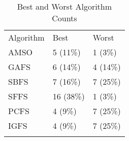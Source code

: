\begin{table}
\caption{Best and Worst Algorithm Counts}
\label{tbl:best:worst:count}
\begin{tabular}{lll}
\noalign{\smallskip}\hline\noalign{\smallskip}
Algorithm&Best&Worst\\
\noalign{\smallskip}\hline
AMSO&5 (11\%)&1 (3\%)\\
GAFS&6 (14\%)&4 (14\%)\\
SBFS&7 (16\%)&7 (25\%)\\
SFFS&16 (38\%)&1 (3\%)\\
PCFS&4 (9\%)&7 (25\%)\\
IGFS&4 (9\%)&7 (25\%)\\
\noalign{\smallskip}\hline
\end{tabular}
\end{table}
